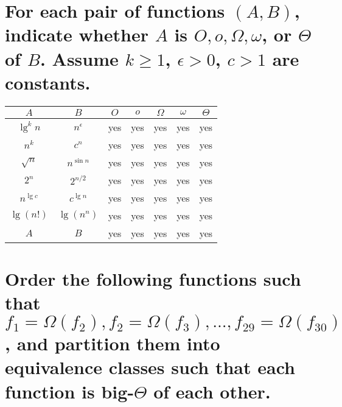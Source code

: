 \section[Problem 5]{For each pair of functions $(A, B)$, indicate whether $A$ is $O, o, \Omega, \omega$, or $\Theta$ of $B$. Assume $k \geq 1$, $\epsilon > 0$, $c > 1$ are constants.}

\begin{center}
	\begin{tabular}{cc|c|c|c|c|c}
		$A$ & $B$ & $O$ & $o$ & $\Omega$ & $\omega$ & $\Theta$ \\ \hline
		$\lg^k n$ & $n^{\epsilon}$ & yes & yes & yes & yes & yes \\ \hline
		$n^k$ & $c^n$ & yes & yes & yes & yes & yes \\ \hline
		$\sqrt{n}$ & $n^{\sin n}$ & yes & yes & yes & yes & yes \\ \hline
		$2^n$ & $2^{n/2}$ & yes & yes & yes & yes & yes \\ \hline
		$n^{\lg c}$ & $c^{\lg n}$ & yes & yes & yes & yes & yes \\ \hline
		$\lg(n!)$ & $\lg(n^n)$ & yes & yes & yes & yes & yes \\ \hline
		$A$ & $B$ & yes & yes & yes & yes & yes
	\end{tabular}
\end{center}

\section[Problem 6]{Order the following functions such that $f_1 = \Omega(f_2), f_2 = \Omega(f_3), ..., f_{29} = \Omega(f_{30})$, and partition them into equivalence classes such that each function is big-$\Theta$ of each other.}
